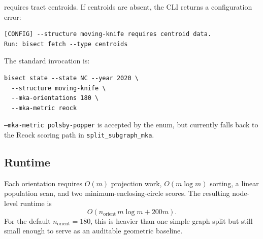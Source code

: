 \mka{} requires tract centroids. If centroids are absent, the CLI returns a
configuration error:
\begin{verbatim}
[CONFIG] --structure moving-knife requires centroid data.
Run: bisect fetch --type centroids
\end{verbatim}

The standard invocation is:
\begin{verbatim}
bisect state --state NC --year 2020 \
  --structure moving-knife \
  --mka-orientations 180 \
  --mka-metric reock
\end{verbatim}

\texttt{--mka-metric polsby-popper} is accepted by the enum, but currently
falls back to the Reock scoring path in \texttt{split\_subgraph\_mka}.

\subsection{Runtime}

Each orientation requires $O(m)$ projection work, $O(m\log m)$ sorting, a
linear population scan, and two minimum-enclosing-circle scores. The resulting
node-level runtime is
\[
  O(n_{\mathrm{orient}}\,m\log m + 200m).
\]
For the default $n_{\mathrm{orient}}=180$, this is heavier than one simple
graph split but still small enough to serve as an auditable geometric baseline.

